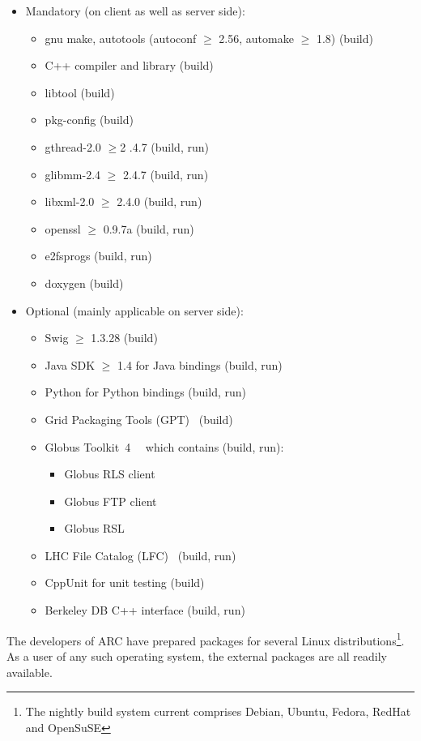 \documentclass{article}                            %
\newcommand{\globus}{Globus Toolkit\textsuperscript{\textregistered}~4~}
\begin{document}
\begin{itemize}
\item Mandatory (on client as well as server side):
\begin{itemize}
\item gnu make, autotools (autoconf $\geq$ 2.56, automake $\geq$ 1.8) (build)
\item C++ compiler and library (build)
\item libtool (build)
\item pkg-config (build)
\item gthread-2.0 $\geq$2 .4.7 (build, run)
\item glibmm-2.4 $\geq$ 2.4.7 (build, run)
\item libxml-2.0 $\geq$ 2.4.0 (build, run)
\item openssl $\geq$ 0.9.7a (build, run)
\item e2fsprogs (build, run)
\item doxygen (build)
\end{itemize}
\item Optional (mainly applicable on server side):
\begin{itemize}
\item Swig $\geq$ 1.3.28 (build)
\item Java SDK $\geq$ 1.4 for Java bindings (build, run)
\item Python for Python bindings (build, run)
\item Grid Packaging Tools (GPT)~\cite{gpt} (build)
\item \globus~\cite{globus} which contains (build, run):
\begin{itemize}
\item Globus RLS client
\item Globus FTP client
\item Globus RSL
\end{itemize}
\item LHC File Catalog (LFC)~\cite{lfc} (build, run)
\item CppUnit for unit testing (build)
\item Berkeley DB C++ interface (build, run)
\end{itemize}
\end{itemize}

The developers of ARC have prepared packages for several Linux
distributions\footnote{The nightly build system current comprises Debian,
Ubuntu, Fedora, RedHat and OpenSuSE}. As a user of any such operating
system, the external packages are all readily available.
\end{document}
